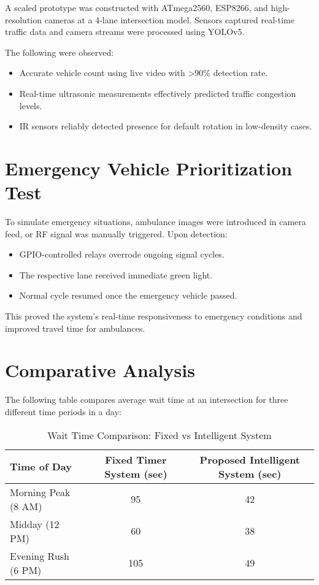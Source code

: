 A scaled prototype was constructed with ATmega2560, ESP8266, and high-resolution cameras at a 4-lane intersection model. Sensors captured real-time traffic data and camera streams were processed using YOLOv5.

The following were observed:
\begin{itemize}
    \item Accurate vehicle count using live video with >90\% detection rate.
    \item Real-time ultrasonic measurements effectively predicted traffic congestion levels.
    \item IR sensors reliably detected presence for default rotation in low-density cases.
\end{itemize}

\section{Emergency Vehicle Prioritization Test}

To simulate emergency situations, ambulance images were introduced in camera feed, or RF signal was manually triggered. Upon detection:
\begin{itemize}
    \item GPIO-controlled relays overrode ongoing signal cycles.
    \item The respective lane received immediate green light.
    \item Normal cycle resumed once the emergency vehicle passed.
\end{itemize}

This proved the system’s real-time responsiveness to emergency conditions and improved travel time for ambulances.

\section{Comparative Analysis}

The following table compares average wait time at an intersection for three different time periods in a day:

\begin{table}[H]
\centering
\caption{Wait Time Comparison: Fixed vs Intelligent System}
\label{tab:waittime}
\begin{tabular}{|p{4cm}|c|c|}
\hline
\textbf{Time of Day} & \textbf{Fixed Timer System (sec)} & \textbf{Proposed Intelligent System (sec)} \\
\hline
Morning Peak (8 AM) & 95 & 42 \\
Midday (12 PM) & 60 & 38 \\
Evening Rush (6 PM) & 105 & 49 \\
\hline
\end{tabular}
\end{table}

